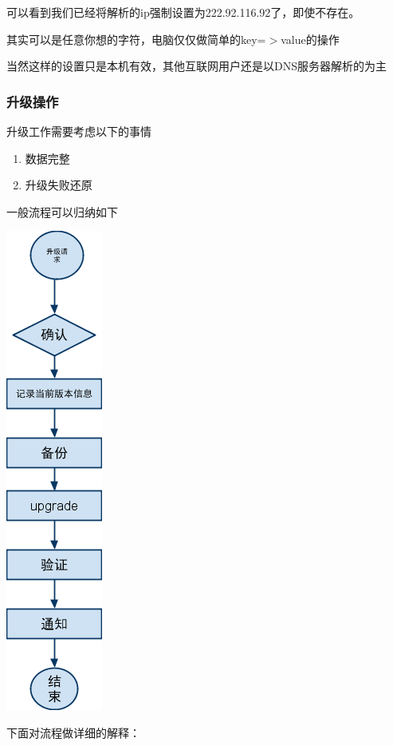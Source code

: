 \documentclass{article}
\begin{document}
可以看到我们已经将解析的ip强制设置为222.92.116.92了，即使不存在。

其实可以是任意你想的字符，电脑仅仅做简单的key=$>$value的操作

当然这样的设置只是本机有效，其他互联网用户还是以DNS服务器解析的为主

\hypertarget{toc19}{}
\subsubsection{升级操作}
升级工作需要考虑以下的事情

\begin{enumerate}
\item 数据完整
\item 升级失败还原
\end{enumerate}

一般流程可以归纳如下

\includegraphics{img/service/dailyop/upgrade/1.png}

下面对流程做详细的解释：
\end{document}
